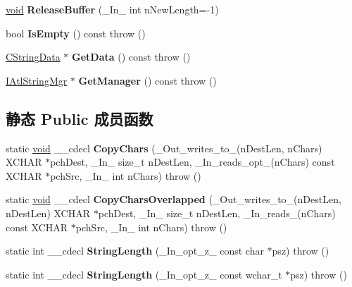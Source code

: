 \begin{DoxyCompactItemize}
\hyperlink{interfacevoid}{void} {\bfseries Release\+Buffer} (\+\_\+\+In\+\_\+ int n\+New\+Length=-\/1)
\item 
\mbox{\label{class_a_t_l_1_1_c_simple_string_t_ab54aa92678db959fbe4ed0955a997b42}} 
bool {\bfseries Is\+Empty} () const  throw ()
\item 
\mbox{\label{class_a_t_l_1_1_c_simple_string_t_a8ca08bcb00847fb610bd976da532d183}} 
\hyperlink{struct_a_t_l_1_1_c_string_data}{C\+String\+Data} $\ast$ {\bfseries Get\+Data} () const  throw ()
\item 
\mbox{\label{class_a_t_l_1_1_c_simple_string_t_ad0225eaaabe5e7849d3f1c30cfa0c97d}} 
\hyperlink{class_a_t_l_1_1_i_atl_string_mgr}{I\+Atl\+String\+Mgr} $\ast$ {\bfseries Get\+Manager} () const  throw ()
\end{DoxyCompactItemize}
\subsection*{静态 Public 成员函数}
\begin{DoxyCompactItemize}
\item 
\mbox{\label{class_a_t_l_1_1_c_simple_string_t_a338c1de012c05d1ee2c0fd4bbe24f0e8}} 
static \hyperlink{interfacevoid}{void} \+\_\+\+\_\+cdecl {\bfseries Copy\+Chars} (\+\_\+\+Out\+\_\+writes\+\_\+to\+\_\+(n\+Dest\+Len, n\+Chars) X\+C\+H\+AR $\ast$pch\+Dest, \+\_\+\+In\+\_\+ size\+\_\+t n\+Dest\+Len, \+\_\+\+In\+\_\+reads\+\_\+opt\+\_\+(n\+Chars) const X\+C\+H\+AR $\ast$pch\+Src, \+\_\+\+In\+\_\+ int n\+Chars)  throw ()
\item 
\mbox{\label{class_a_t_l_1_1_c_simple_string_t_a9cead926729a9be9bb67b00973b1540a}} 
static \hyperlink{interfacevoid}{void} \+\_\+\+\_\+cdecl {\bfseries Copy\+Chars\+Overlapped} (\+\_\+\+Out\+\_\+writes\+\_\+to\+\_\+(n\+Dest\+Len, n\+Dest\+Len) X\+C\+H\+AR $\ast$pch\+Dest, \+\_\+\+In\+\_\+ size\+\_\+t n\+Dest\+Len, \+\_\+\+In\+\_\+reads\+\_\+(n\+Chars) const X\+C\+H\+AR $\ast$pch\+Src, \+\_\+\+In\+\_\+ int n\+Chars)  throw ()
\item 
\mbox{\label{class_a_t_l_1_1_c_simple_string_t_a2be5d97d7917f547380a5a6d76a939ae}} 
static int \+\_\+\+\_\+cdecl {\bfseries String\+Length} (\+\_\+\+In\+\_\+opt\+\_\+z\+\_\+ const char $\ast$psz)  throw ()
\item 
\mbox{\label{class_a_t_l_1_1_c_simple_string_t_ace85e6c02d83a60d78b808fbe53b0544}} 
static int \+\_\+\+\_\+cdecl {\bfseries String\+Length} (\+\_\+\+In\+\_\+opt\+\_\+z\+\_\+ const wchar\+\_\+t $\ast$psz)  throw ()
\end{DoxyCompactItemize}
